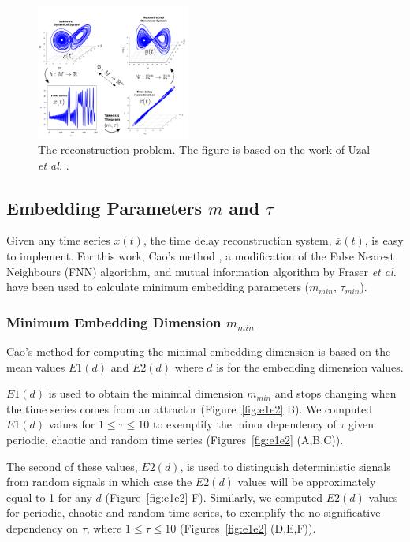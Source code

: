 \documentclass[10pt,journal,compsoc]{IEEEtran}
\begin{document}
\begin{figure}[!htb]
\centering    
 \includegraphics[width=0.45\textwidth]{takens_theorem_v6}
\caption[PA]{The reconstruction problem. The figure is based on the work of Uzal 
\textit{et al.} \cite{Uzal2011}.}
\label{fig:takens_theorem}
\end{figure}

\subsection{Embedding Parameters $m$ and $\tau$}
Given any time series $x(t)$, the time delay reconstruction 
system, $\overline{x}(t)$, is easy to implement. For this work, Cao's 
method \cite{Cao1997}, a modification of the False Nearest Neighbours 
(FNN) algorithm, and mutual information algorithm by 
Fraser \textit{et al.} \cite{Fraser1986} have been used to calculate minimum 
embedding parameters ($m_{min}$, $\tau_{min}$).

\subsubsection{Minimum Embedding Dimension $m_{min}$}
Cao's method \cite{Cao1997} for computing the minimal embedding 
dimension is based on the mean values $E1(d)$ and $E2(d)$ 
where $d$ is for the embedding dimension values.

$E1(d)$ is used to obtain the minimal dimension $m_{min}$ 
and stops changing when the time series comes from an 
attractor (Figure~\ref{fig:e1e2} B). We computed $E1(d)$ values for 
$1 \leq \tau \leq 10$ to exemplify the minor dependency of $\tau$ 
given periodic, chaotic and random time series (Figures~\ref{fig:e1e2} (A,B,C)).

The second of these values, $E2(d)$, is used to distinguish 
deterministic signals from random signals in which case 
the $E2(d)$ values will be approximately equal to 1 for 
any $d$ (Figure~\ref{fig:e1e2} F).
Similarly, we computed $E2(d)$ values 
for periodic, chaotic and random time series, to exemplify 
the no significative dependency on $\tau$, where $1 \leq \tau \leq 10$ 
(Figures~\ref{fig:e1e2} (D,E,F)).
\end{document}
